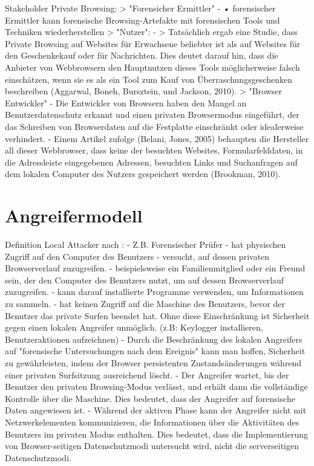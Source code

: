 Stakeholder Private Browsing:
	> "Forensicher Ermittler"
		- \cite{Montasari.2015}
			•	forensischer Ermittler kann forensische Browsing-Artefakte mit forensischen Tools und Techniken wiederherstellen
	> "Nutzer": 
		- \cite{Said.2011}
			>	Tatsächlich ergab eine Studie, dass Private Browsing auf Websites für Erwachsene beliebter ist als auf Websites für den Geschenkekauf oder für Nachrichten. Dies deutet darauf hin, dass die Anbieter von Webbrowsern den Hauptnutzen dieses Tools möglicherweise falsch einschätzen, wenn sie es als ein Tool zum Kauf von Überraschungsgeschenken beschreiben (Aggarwal, Boneh, Bursztein, und Jackson, 2010).
	> "Browser Entwickler"
		- \cite{Mahlous.2020}
			Die Entwickler von Browsern haben den Mangel an Benutzerdatenschutz erkannt und einen privaten Browsermodus eingeführt, der das Schreiben von Browserdaten auf die Festplatte einschränkt oder idealerweise verhindert.
		- \cite{Said.2011}
			Einem Artikel zufolge (Belani, Jones, 2005) behaupten die Hersteller all dieser Webbrowser, dass keine der besuchten Websites, Formularfelddaten, in die Adressleiste eingegebenen Adressen, besuchten Links und Suchanfragen auf dem lokalen Computer des Nutzers gespeichert werden (Brookman, 2010).



\section{Angreifermodell}

Definition Local Attacker nach \cite{Aggarwal.2010}:
	-	Z.B. Forensischer Prüfer
	-	hat physischen Zugriff auf den Computer des Benutzers 
	-	versucht, auf dessen privaten Browserverlauf zuzugreifen. 
	-	beispielsweise ein Familienmitglied oder ein Freund sein, der den Computer des Benutzers nutzt, um auf dessen Browserverlauf zuzugreifen. 
	-	kann darauf installierte Programme verwenden, um Informationen zu sammeln.
	-	hat keinen Zugriff auf die Maschine des Benutzers, bevor der Benutzer das private Surfen beendet hat. Ohne diese Einschränkung ist Sicherheit gegen einen lokalen Angreifer unmöglich. (z.B: Keylogger installieren, Benutzeraktionen aufzeichnen)
	-	Durch die Beschränkung des lokalen Angreifers auf "forensische Untersuchungen nach dem Ereignis" kann man hoffen, Sicherheit zu gewährleisten, indem der Browser persistenten Zustandsänderungen während einer privaten Surfsitzung ausreichend löscht.
	-	Der Angreifer wartet, bis der Benutzer den privaten Browsing-Modus verlässt, und erhält dann die vollständige Kontrolle über die Maschine. Dies bedeutet, dass der Angreifer auf forensische Daten angewiesen ist.
	-	Während der aktiven Phase kann der Angreifer nicht mit Netzwerkelementen kommunizieren, die Informationen über die Aktivitäten des Benutzers im privaten Modus enthalten. Dies bedeutet, dass die Implementierung von Browser-seitigen Datenschutzmodi untersucht wird, nicht die serverseitigen Datenschutzmodi.
	
